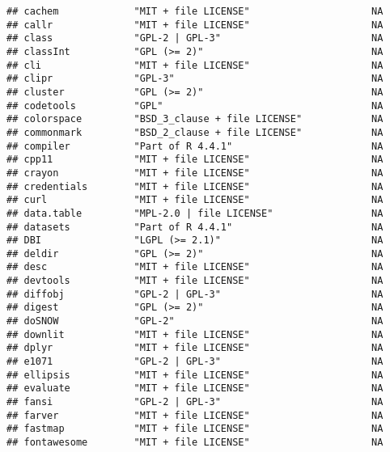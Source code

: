 \documentclass[
]{article}
\begin{document}
\begin{verbatim}
## cachem             "MIT + file LICENSE"                     NA             
## callr              "MIT + file LICENSE"                     NA             
## class              "GPL-2 | GPL-3"                          NA             
## classInt           "GPL (>= 2)"                             NA             
## cli                "MIT + file LICENSE"                     NA             
## clipr              "GPL-3"                                  NA             
## cluster            "GPL (>= 2)"                             NA             
## codetools          "GPL"                                    NA             
## colorspace         "BSD_3_clause + file LICENSE"            NA             
## commonmark         "BSD_2_clause + file LICENSE"            NA             
## compiler           "Part of R 4.4.1"                        NA             
## cpp11              "MIT + file LICENSE"                     NA             
## crayon             "MIT + file LICENSE"                     NA             
## credentials        "MIT + file LICENSE"                     NA             
## curl               "MIT + file LICENSE"                     NA             
## data.table         "MPL-2.0 | file LICENSE"                 NA             
## datasets           "Part of R 4.4.1"                        NA             
## DBI                "LGPL (>= 2.1)"                          NA             
## deldir             "GPL (>= 2)"                             NA             
## desc               "MIT + file LICENSE"                     NA             
## devtools           "MIT + file LICENSE"                     NA             
## diffobj            "GPL-2 | GPL-3"                          NA             
## digest             "GPL (>= 2)"                             NA             
## doSNOW             "GPL-2"                                  NA             
## downlit            "MIT + file LICENSE"                     NA             
## dplyr              "MIT + file LICENSE"                     NA             
## e1071              "GPL-2 | GPL-3"                          NA             
## ellipsis           "MIT + file LICENSE"                     NA             
## evaluate           "MIT + file LICENSE"                     NA             
## fansi              "GPL-2 | GPL-3"                          NA             
## farver             "MIT + file LICENSE"                     NA             
## fastmap            "MIT + file LICENSE"                     NA             
## fontawesome        "MIT + file LICENSE"                     NA             

\end{verbatim}
\end{document}
